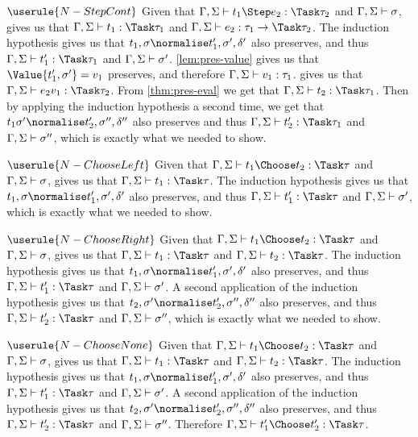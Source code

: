 \case
  {$\userule{N-StepCont}$}
  {Given that $\Gamma,\Sigma\infers t_1\Step e_2:\Task\tau_2$ and $\Gamma,\Sigma\vdash \sigma$,  gives us that $\Gamma,\Sigma\infers t_1:\Task\tau_1$ and $\Gamma,\Sigma\infers e_2:\tau_1\to\Task \tau_2$.
  The induction hypothesis gives us that $t_1,\sigma\normalise t_1',\sigma',\delta'$ also preserves, and thus $\Gamma,\Sigma\infers t_1':\Task\tau_1$ and $\Gamma,\Sigma\vdash\sigma'$.
  \cref{lem:pres-value} gives us that $\Value{t_1',\sigma'}=v_1$ preserves, and therefore $\Gamma,\Sigma\vdash v_1:\tau_1$.
   gives us that $\Gamma,\Sigma\infers e_2 v_1 : \Task\tau_2$.
  From \cref{thm:pres-eval} we get that $\Gamma,\Sigma\infers t_2:\Task\tau_1$.
  Then by applying the induction hypothesis a second time, we get that $t_1\sigma'\normalise t_2',\sigma'',\delta''$ also preserves and thus $\Gamma,\Sigma\infers t_2':\Task\tau_1$ and $\Gamma,\Sigma\vdash \sigma''$, which is exactly what we needed to show.}

\case
  {$\userule{N-ChooseLeft}$}
  {Given that $\Gamma,\Sigma\infers t_1 \Choose t_2 : \Task \tau$ and $\Gamma,\Sigma\vdash\sigma$,  gives us that $\Gamma,\Sigma\infers t_1:\Task\tau$.
  The induction hypothesis gives us that $t_1,\sigma\normalise t_1',\sigma',\delta'$ also preserves,
  and thus $\Gamma,\Sigma\infers t_1':\Task\tau$ and $\Gamma,\Sigma\vdash \sigma'$, which is exactly what we needed to show.}

\case
  {$\userule{N-ChooseRight}$}
  {Given that $\Gamma,\Sigma\infers t_1 \Choose t_2 : \Task \tau$ and $\Gamma,\Sigma\vdash\sigma$,  gives us that $\Gamma,\Sigma\infers t_1:\Task\tau$ and $\Gamma,\Sigma\infers t_2:\Task \tau$.
  The induction hypothesis gives us that $t_1,\sigma\normalise t_1',\sigma',\delta'$ also preserves,
  and thus $\Gamma,\Sigma\infers t_1':\Task\tau$ and $\Gamma,\Sigma\vdash \sigma'$.
  A second application of the induction hypothesis gives us that $t_2,\sigma'\normalise t_2',\sigma'',\delta''$ also preserves, and thus $\Gamma,\Sigma\infers t_2':\Task\tau$ and $\Gamma,\Sigma\vdash\sigma''$, which is exactly what we needed to show.}

\case
  {$\userule{N-ChooseNone}$}
  {Given that $\Gamma,\Sigma\infers t_1 \Choose t_2 : \Task \tau$ and $\Gamma,\Sigma\vdash\sigma$,  gives us that $\Gamma,\Sigma\infers t_1:\Task\tau$ and $\Gamma,\Sigma\infers t_2:\Task \tau$.
  The induction hypothesis gives us that $t_1,\sigma\normalise t_1',\sigma',\delta'$ also preserves,
  and thus $\Gamma,\Sigma\infers t_1':\Task\tau$ and $\Gamma,\Sigma\vdash \sigma'$.
  A second application of the induction hypothesis gives us that $t_2,\sigma'\normalise t_2',\sigma'',\delta''$ also preserves, and thus $\Gamma,\Sigma\infers t_2':\Task\tau$ and $\Gamma,\Sigma\vdash\sigma''$.
  Therefore $\Gamma,\Sigma\infers t_1'\Choose t_2':\Task\tau$.}

